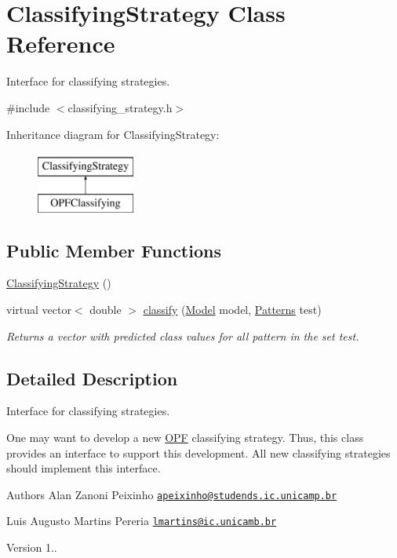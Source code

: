 \hypertarget{classClassifyingStrategy}{\section{Classifying\+Strategy Class Reference}
\label{classClassifyingStrategy}
}


Interface for classifying strategies.  




{\ttfamily \#include $<$classifying\+\_\+strategy.\+h$>$}

Inheritance diagram for Classifying\+Strategy\+:\begin{figure}[H]
\begin{center}
\leavevmode
\includegraphics[height=2.000000cm]{classClassifyingStrategy}
\end{center}
\end{figure}
\subsection*{Public Member Functions}
\begin{DoxyCompactItemize}
\item 
\hyperlink{classClassifyingStrategy_a8dd920216306e6df413a9e5e0b34d93b}{Classifying\+Strategy} ()
\item 
virtual vector$<$ double $>$ \hyperlink{classClassifyingStrategy_a0b0e637921ba52ff52069824e96cab7b}{classify} (\hyperlink{classModel}{Model} model, \hyperlink{classPatterns}{Patterns} test)
\begin{DoxyCompactList}\small\item\em Returns a vector with predicted class values for all pattern in the set test. \end{DoxyCompactList}\end{DoxyCompactItemize}


\subsection{Detailed Description}
Interface for classifying strategies. 

One may want to develop a new \hyperlink{classOPF}{O\+P\+F} classifying strategy. Thus, this class provides an interface to support this development. All new classifying strategies should implement this interface. \begin{DoxyAuthor}{Authors}
Alan Zanoni Peixinho \href{mailto:apeixinho@studends.ic.unicamp.br}{\tt apeixinho@studends.\+ic.\+unicamp.\+br} 

Luis Augusto Martins Pereria \href{mailto:lmartins@ic.unicamb.br}{\tt lmartins@ic.\+unicamb.\+br} 
\end{DoxyAuthor}
\begin{DoxyVersion}{Version}
1.. 
\end{DoxyVersion}


